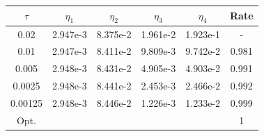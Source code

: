 \begin{center} 
\centering
\begin{tabular}{c|c|c|c|c|c}
$\tau$ & $\eta_1$ & $\eta_2$ & $\eta_3$ & $\eta_4$ & Rate\\\hline
0.02    & 2.947e-3 & 8.375e-2 & 1.961e-2 & 1.923e-1 & -    \\
0.01    & 2.947e-3 & 8.411e-2 & 9.809e-3 & 9.742e-2 & 0.981\\
0.005   & 2.948e-3 & 8.431e-2 & 4.905e-3 & 4.903e-2 & 0.991\\
0.0025  & 2.948e-3 & 8.441e-2 & 2.453e-3 & 2.466e-2 & 0.992\\
0.00125 & 2.948e-3 & 8.446e-2 & 1.226e-3 & 1.233e-2 & 0.999\\\hline
Opt. & & & & & 1
\end{tabular}
 \label{tab:biot_default_time_est}
\end{center}
